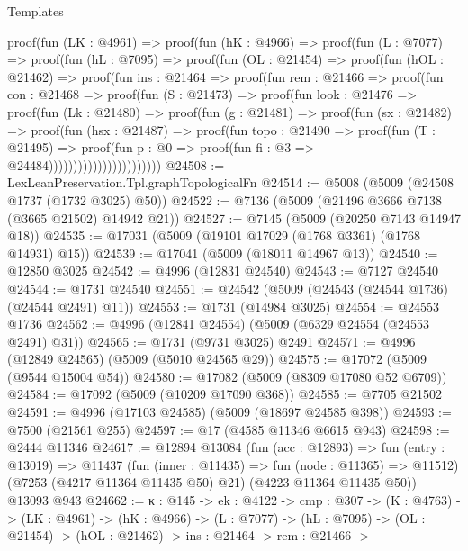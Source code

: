 \begin{lexlean}{Templates}
\begin{coremodule}
          proof(fun (LK : @4961) =>
            proof(fun (hK : @4966) =>
              proof(fun (L : @7077) =>
                proof(fun (hL : @7095) =>
                  proof(fun (OL : @21454) =>
                    proof(fun (hOL : @21462) =>
                      proof(fun {ins : @21464} =>
                        proof(fun {rem : @21466} =>
                          proof(fun {con : @21468} =>
                            proof(fun (S : @21473) =>
                              proof(fun {look : @21476} =>
                                proof(fun (Lk : @21480) =>
                                  proof(fun (g : @21481) =>
                                    proof(fun (sx : @21482) =>
                                      proof(fun (hsx : @21487) =>
                                        proof(fun {topo : @21490} =>
                                          proof(fun (T : @21495) =>
                                            proof(fun {p : @0} =>
                                              proof(fun {fi : @3} => @24484)))))))))))))))))))))))
@24508 := LexLeanPreservation.Tpl.graphTopologicalFn
@24514 := @5008 (@5009 (@24508 @1737 (@1732 @3025) @50))
@24522 := @7136 (@5009 (@21496 @3666 @7138 (@3665 @21502) @14942 @21))
@24527 := @7145 (@5009 (@20250 @7143 @14947 @18))
@24535 := @17031 (@5009 (@19101 @17029 (@1768 @3361) (@1768 @14931) @15))
@24539 := @17041 (@5009 (@18011 @14967 @13))
@24540 := @12850 @3025
@24542 := @4996 (@12831 @24540)
@24543 := @7127 @24540
@24544 := @1731 @24540
@24551 := @24542 (@5009 (@24543 (@24544 @1736) (@24544 @2491) @11))
@24553 := @1731 (@14984 @3025)
@24554 := @24553 @1736
@24562 := @4996 (@12841 @24554) (@5009 (@6329 @24554 (@24553 @2491) @31))
@24565 := @1731 (@9731 @3025) @2491
@24571 := @4996 (@12849 @24565) (@5009 (@5010 @24565 @29))
@24575 := @17072 (@5009 (@9544 @15004 @54))
@24580 := @17082 (@5009 (@8309 @17080 @52 @6709))
@24584 := @17092 (@5009 (@10209 @17090 @368))
@24585 := @7705 @21502
@24591 := @4996 (@17103 @24585) (@5009 (@18697 @24585 @398))
@24593 := @7500 (@21561 @255)
@24597 := @17 (@4585 @11346 @6615 @943)
@24598 := @2444 @11346
@24617 := @12894
    @13084
    (fun (acc : @12893) =>
    fun (entry : @13019) =>
    @11437
      (fun (inner : @11435) => fun (node : @11365) => @11512)
      (@7253 (@4217 @11364 @11435 @50) @21)
      (@4223 @11364 @11435 @50))
    @13093
    @943
@24662 := {κ : @145} ->
  {ek : @4122} ->
  {cmp : @307} ->
  (K : @4763) ->
  (LK : @4961) ->
  (hK : @4966) ->
  (L : @7077) ->
  (hL : @7095) ->
  (OL : @21454) ->
  (hOL : @21462) ->
  {ins : @21464} ->
  {rem : @21466} ->

\end{coremodule}
\end{lexlean}
